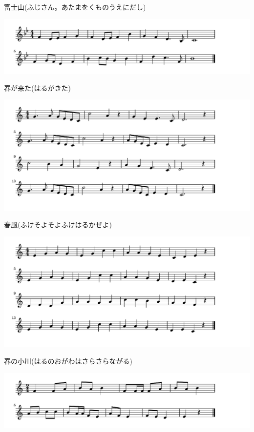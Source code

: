 \documentclass[a4paper]{ltjsarticle}
\begin{document}
\vspace{-10mm} \hspace{10mm}
富士山(ふじさん。あたまをくものうえにだし)

\includegraphics[clip]{harugakita_crop.pdf}

\vspace{-10mm} \hspace{10mm}
春が来た(はるがきた)

\includegraphics[clip]{harukaze_crop.pdf}

\vspace{-10mm} \hspace{10mm}
春風(ふけそよそよふけはるかぜよ)

\includegraphics[clip]{harunoogawa_crop.pdf}

\vspace{-10mm} \hspace{10mm}
春の小川(はるのおがわはさらさらながる)


\includegraphics[clip]{usagi_crop.pdf}
\end{document}
